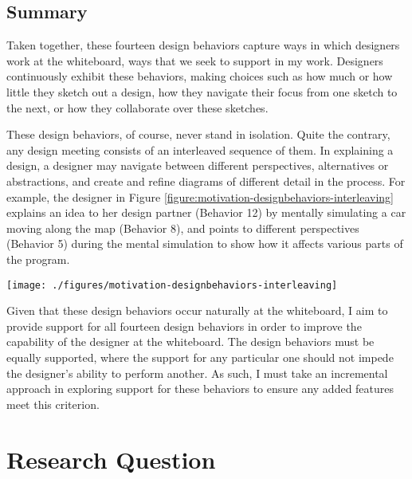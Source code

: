 \documentclass[12pt,fleqn]{ucithesis}
\begin{document}
\section{Summary}

Taken together, these fourteen design behaviors capture ways in which designers work at the whiteboard, ways that we seek to support in my work. Designers continuously exhibit these behaviors, making choices such as how much or how little they sketch out a design, how they navigate their focus from one sketch to the next, or how they collaborate over these sketches.

These design behaviors, of course, never stand in isolation.  Quite the contrary, any design meeting consists of an interleaved sequence of them.  In explaining a design, a designer may navigate between different perspectives, alternatives or abstractions, and create and refine diagrams of different detail in the process. For example, the designer in Figure \ref{figure:motivation-designbehaviors-interleaving} explains an idea to her design partner (Behavior 12) by mentally simulating a car moving along the map (Behavior 8), and points to different perspectives (Behavior 5) during the mental simulation to show how it affects various parts of the program. 

 \begin{figure*}[tbh]
  \centering
  \texttt{[image: ./figures/motivation-designbehaviors-interleaving]}
  \caption{The designer interleaves many design behaviors.}
  \label{figure:motivation-designbehaviors-interleaving}
\end{figure*} 

Given that these design behaviors occur naturally at the whiteboard, I aim to provide support for all fourteen design behaviors in order to improve the capability of the designer at the whiteboard. The design behaviors must be equally supported, where the support for any particular one should not impede the designer's ability to perform another. As such, I must take an incremental approach in exploring support for these behaviors to ensure any added features meet this criterion.

\chapter{Research Question}
\label{chapter:research-question}
\end{document}
